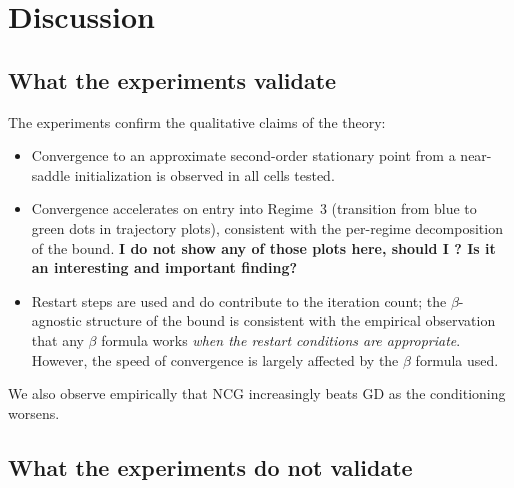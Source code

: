 \documentclass[11pt,a4paper]{article}
\theoremstyle{plain}
\theoremstyle{definition}
\begin{document}

\section{Discussion}\label{sec:discussion}

\subsection{What the experiments validate}\label{subsec:disc-validate}

The experiments confirm the qualitative claims of the theory:
\begin{itemize}[leftmargin=2em]
  \item Convergence to an approximate second-order stationary point from a near-saddle initialization is observed in all cells tested.
  \item Convergence accelerates on entry into Regime~3 (transition from blue to green dots in trajectory plots), consistent with the per-regime decomposition of the bound. \textbf{I do not show any of those plots here, should I ? Is it an interesting and important finding?}
  \item Restart steps are used and do contribute to the iteration count; the $\beta$-agnostic structure of the bound is consistent with the empirical observation that any $\beta$ formula works \emph{when the restart conditions are appropriate}. However, the speed of convergence is largely affected by the $\beta$ formula used.
\end{itemize}

We also observe empirically that NCG increasingly beats GD as the conditioning worsens.

\subsection{What the experiments do not validate}\label{subsec:disc-not-validate}
\end{document}
